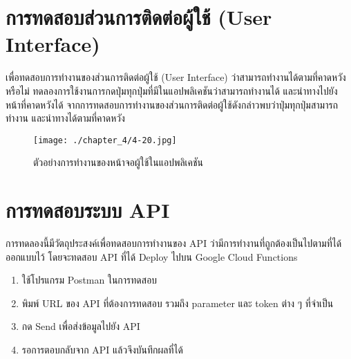 \section{การทดสอบส่วนการติดต่อผู้ใช้ (User Interface)}
เพื่อทดสอบการทำงานของส่วนการติดต่อผู้ใช้ (User Interface) ว่าสามารถทำงานได้ตามที่คาดหวังหรือไม่
ทดลองการใช้งานการกดปุ่มทุกปุ่มที่มีในแอปพลิเคชันว่าสามารถทำงานได้ และนำทางไปยังหน้าที่คาดหวังได้
จากการทดสอบการทำงานของส่วนการติดต่อผู้ใช้ดังกล่าวพบว่าปุ่มทุกปุ่มสามารถทำงาน และนำทางได้ตามที่คาดหวัง
\begin{figure}
	\texttt{[image: ./chapter\_4/4-20.jpg]}
	\caption{ตัวอย่างการทำงานของหน้าจอผู้ใช้ในแอปพลิเคชัน}
\end{figure}

\section{การทดสอบระบบ API}
การทดลองนี้มีวัตถุประสงค์เพื่อทดสอบการทำงานของ API ว่ามีการทำงานที่ถูกต้องเป็นไปตามที่ได้ออกแบบไว้ โดยจะทดสอบ API ที่ได้ Deploy ไปบน Google Cloud Functions
\begin{enumerate}
	\item ใช้โปรแกรม Postman ในการทดสอบ
	\item พิมพ์ URL ของ API ที่ต้องการทดสอบ รวมถึง parameter และ token ต่าง ๆ ที่จำเป็น
	\item กด Send เพื่อส่งข้อมูลไปยัง API
	\item รอการตอบกลับจาก API แล้วจึงบันทึกผลที่ได้
\end{enumerate}

